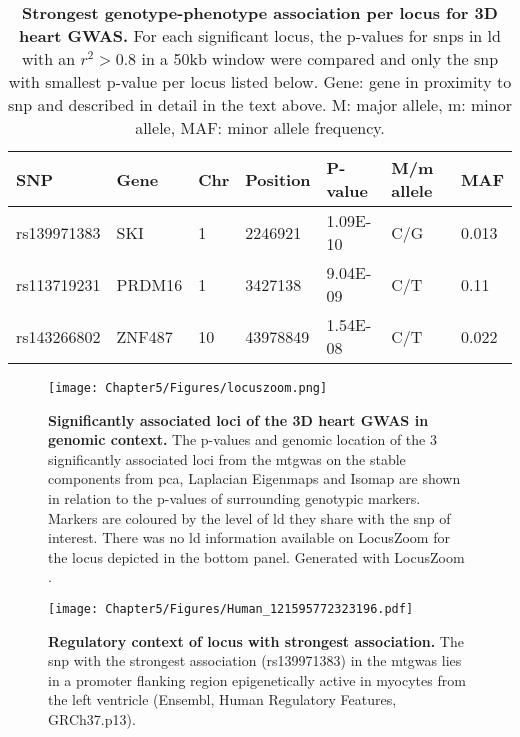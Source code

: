 \begin{table}[htbp]
  \centering
  \caption[\textbf{Strongest genotype-phenotype association per locus for 3D heart GWAS. }]{\textbf{Strongest genotype-phenotype association per locus for 3D heart GWAS. } For each significant locus, the p-values for \glspl{snp} in \gls{ld} with an \(r^2 > 0.8\) in a \num{50}kb window were compared and only the \gls{snp}  with smallest p-value per locus listed below. Gene: gene in proximity to \gls{snp}  and described in detail in the text above. M: major allele, m:  minor allele, MAF: minor allele frequency. }
  \begin{small}
    \begin{tabular}{lllllll}
    \toprule
    SNP   & Gene & Chr   & Position & P-value &  M/m allele & MAF \\
    \midrule
    rs139971383 & SKI & \num{1} & \num{2246921} & \num{1.09E-10} & C/G     & \num{0.013} \\
    rs113719231 & PRDM16 & \num{1} & \num{3427138} & \num{9.04E-09} & C/T     & \num{0.11} \\
    rs143266802 & ZNF487 & \num{10} & \num{43978849} & \num{1.54E-08} & C/T     & \num{0.022} \\
    \bottomrule
    \end{tabular}%
    \end{small}
  \label{tab:gwas-heart}%
\end{table}%
%
\begin{figure}[hbtp]
	\centering
	\texttt{[image: Chapter5/Figures/locuszoom.png]}
	\caption[\textbf{Significantly associated loci of the 3D heart GWAS in genomic context. }]{\textbf{Significantly associated loci of the 3D heart GWAS in genomic context. }The p-values and genomic location of the \num{3} significantly associated loci from the \gls{mtgwas} on the stable components from \gls{pca}, Laplacian Eigenmaps and Isomap are shown in relation to the p-values of surrounding genotypic markers. Markers are coloured by the level of \gls{ld} they share with the \gls{snp}  of interest. There was no \gls{ld} information available on LocusZoom for the locus depicted in the bottom panel. Generated with LocusZoom \citep{Pruim2010}.}  
	 	\label{fig:locuszoom-heart}
\end{figure}
%
\begin{figure}[hbtp]
	\centering
	\texttt{[image: Chapter5/Figures/Human\_121595772323196.pdf]}
	\caption[\textbf{Regulatory context of locus with strongest association. }]{\textbf{Regulatory context of locus with strongest association. } The \gls{snp} with the strongest association (rs139971383) in the \gls{mtgwas} lies in a promoter flanking region epigenetically active in myocytes from the left ventricle (Ensembl, Human Regulatory Features, GRCh37.p13). } 
	 	\label{fig:regulatory-heart}
\end{figure}

